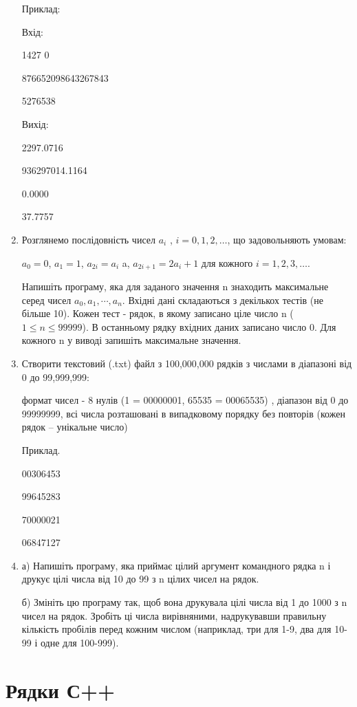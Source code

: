 \documentclass[]{article}
\begin{document}
\begin{enumerate}
Приклад:

Вхід:

1427 0

876652098643267843

5276538

Вихід:

2297.0716

936297014.1164

0.0000

37.7757
\item
Розглянемо послідовність чисел
\(a_{i}\) , $i = 0, 1, 2, \ldots$, що задовольняють умовам:

\(a_{0} = 0\), \(a_{1} = 1\), \(a_{2i} = a_{i}\) a,
\(a_{2i + 1} = {2a}_{i} + 1\) для кожного $i = 1, 2, 3, \ldots $.

Напишіть програму, яка для заданого значення n знаходить максимальне
серед чисел \(a_{0},a_{1},\cdots,a_{n}\). Вхідні дані складаються з
декількох тестів (не більше 10). Кожен тест - рядок, в якому записано
ціле число n ($1 \le n \le 99 999$). В останньому рядку вхідних даних записано
число 0. Для кожного n у виводі запишіть максимальне значення.
\item
Створити текстовий (.txt) файл з 100,000,000 рядків з числами в
діапазоні від 0 до 99,999,999:

формат чисел - 8 нулів (1 = 00000001, 65535 = 00065535) , діапазон від 0
до 99999999, всі числа розташовані в випадковому порядку без повторів
(кожен рядок -- унікальне число)

Приклад.

00306453

99645283

70000021

06847127


\item
 а) Напишіть програму, яка приймає цілий аргумент командного рядка n і друкує цілі числа від 10 до 99 з n цілих чисел на рядок.

 б) Змініть цю програму так, щоб вона друкувала цілі числа від 1 до 1000 з n чисел на рядок.
Зробіть ці числа вирівняними, надрукувавши правильну кількість пробілів перед кожним числом (наприклад, три для 1-9, два для 10-99 і одне для 100-999).


\end{enumerate}

\section {Рядки С++}
\end{document}
